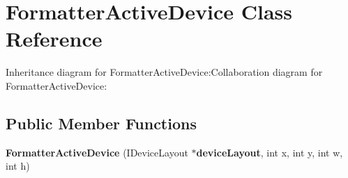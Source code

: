 \section{FormatterActiveDevice Class Reference}
\label{classbr_1_1pucrio_1_1telemidia_1_1ginga_1_1ncl_1_1multidevice_1_1FormatterActiveDevice}
Inheritance diagram for FormatterActiveDevice:Collaboration diagram for FormatterActiveDevice:\subsection*{Public Member Functions}
\begin{CompactItemize}
\item 
\textbf{FormatterActiveDevice} (IDeviceLayout $\ast${\bf deviceLayout}, int x, int y, int w, int h)\label{classbr_1_1pucrio_1_1telemidia_1_1ginga_1_1ncl_1_1multidevice_1_1FormatterActiveDevice_54fe648b2555054a1c4bc376b5f55464}

\end{CompactItemize}
